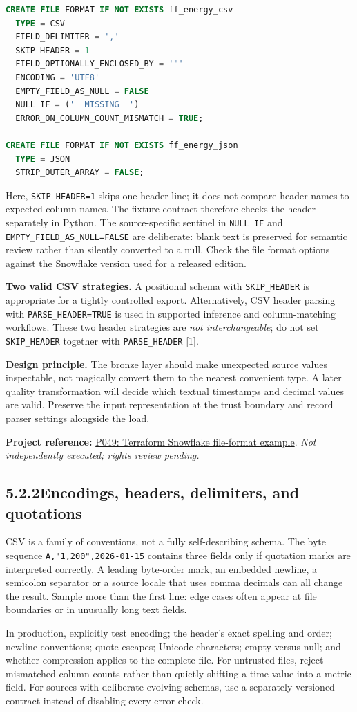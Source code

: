 \documentclass[11pt,twoside]{article}
\newcommand{\topic}[2]{\subsection*{#1\quad #2}}
\newcommand{\repo}[2]{\par\begingroup\fontsize{8.0}{9.6}\selectfont\sffamily\color{inkgray}\textbf{Project reference:} \href{#2}{#1}. \textit{Not independently executed; rights review pending.}\par\endgroup}
\begin{document}
\begin{lstlisting}[language=SQL,caption={Named formats for a controlled CSV and JSON source.}]
CREATE FILE FORMAT IF NOT EXISTS ff_energy_csv
  TYPE = CSV
  FIELD_DELIMITER = ','
  SKIP_HEADER = 1
  FIELD_OPTIONALLY_ENCLOSED_BY = '"'
  ENCODING = 'UTF8'
  EMPTY_FIELD_AS_NULL = FALSE
  NULL_IF = ('__MISSING__')
  ERROR_ON_COLUMN_COUNT_MISMATCH = TRUE;

CREATE FILE FORMAT IF NOT EXISTS ff_energy_json
  TYPE = JSON
  STRIP_OUTER_ARRAY = FALSE;
\end{lstlisting}
Here, \texttt{SKIP\_HEADER=1} skips one header line; it does not compare header names to expected column names. The fixture contract therefore checks the header separately in Python. The source-specific sentinel in \texttt{NULL\_IF} and \texttt{EMPTY\_FIELD\_AS\_NULL=FALSE} are deliberate: blank text is preserved for semantic review rather than silently converted to a null. Check the file format options against the Snowflake version used for a released edition.

\textbf{Two valid CSV strategies.} A positional schema with \texttt{SKIP\_HEADER} is appropriate for a tightly controlled export. Alternatively, CSV header parsing with \texttt{PARSE\_HEADER=TRUE} is used in supported inference and column-matching workflows. These two header strategies are \emph{not interchangeable}; do not set \texttt{SKIP\_HEADER} together with \texttt{PARSE\_HEADER} [1].

\textbf{Design principle.} The bronze layer should make unexpected source values inspectable, not magically convert them to the nearest convenient type. A later quality transformation will decide which textual timestamps and decimal values are valid. Preserve the input representation at the trust boundary and record parser settings alongside the load.
\repo{P049: Terraform Snowflake file-format example}{https://github.com/subhamay-bhattacharyya-tf/terraform-snowflake-file-format}
\newpage
\topic{5.2.2}{Encodings, headers, delimiters, and quotations}
CSV is a family of conventions, not a fully self-describing schema. The byte sequence \texttt{A,"1,200",2026-01-15} contains three fields only if quotation marks are interpreted correctly. A leading byte-order mark, an embedded newline, a semicolon separator or a source locale that uses comma decimals can all change the result. Sample more than the first line: edge cases often appear at file boundaries or in unusually long text fields.

In production, explicitly test encoding; the header's exact spelling and order; newline conventions; quote escapes; Unicode characters; empty versus null; and whether compression applies to the complete file. For untrusted files, reject mismatched column counts rather than quietly shifting a time value into a metric field. For sources with deliberate evolving schemas, use a separately versioned contract instead of disabling every error check.
\end{document}

